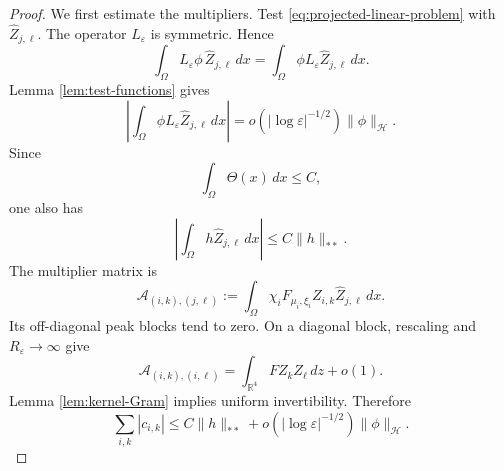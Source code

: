 \documentclass[11pt]{article}
\numberwithin{equation}{section}
\begin{document}
\begin{proof}
We first estimate the multipliers. Test
\eqref{eq:projected-linear-problem} with
$\widehat Z_{j,\ell}$. The operator $L_\varepsilon$ is symmetric.
Hence
\begin{equation*}
\int_\Omega L_\varepsilon\phi\,\widehat Z_{j,\ell}\,dx
=
\int_\Omega\phi L_\varepsilon\widehat Z_{j,\ell}\,dx.
\end{equation*}
Lemma \ref{lem:test-functions} gives
\begin{equation*}
\left|
\int_\Omega\phi L_\varepsilon\widehat Z_{j,\ell}\,dx
\right|
=o(|\log\varepsilon|^{-1/2})\|\phi\|_{\mathcal H}.
\end{equation*}
Since
\begin{equation}\label{eq:theta-L1}
\int_\Omega\Theta(x)\,dx\leq C,
\end{equation}
one also has
\begin{equation*}
\left|\int_\Omega h\widehat Z_{j,\ell}\,dx\right|
\leq C\|h\|_{**}.
\end{equation*}
The multiplier matrix is
\begin{equation}\label{eq:linear-multiplier-matrix}
\mathcal A_{(i,k),(j,\ell)}
:=
\int_\Omega
\chi_iF_{\mu_i,\xi_i}Z_{i,k}\widehat Z_{j,\ell}\,dx.
\end{equation}
Its off-diagonal peak blocks tend to zero. On a diagonal block,
rescaling and $R_\varepsilon\to\infty$ give
\begin{equation*}
\mathcal A_{(i,k),(i,\ell)}
=
\int_{\mathbb R^4}FZ_kZ_\ell\,dz+o(1).
\end{equation*}
Lemma \ref{lem:kernel-Gram} implies uniform invertibility. Therefore
\begin{equation}\label{eq:coefficient-preestimate}
\sum_{i,k}|c_{i,k}|
\leq C\|h\|_{**}
+o(|\log\varepsilon|^{-1/2})\|\phi\|_{\mathcal H}.
\end{equation}


\end{proof}
\end{document}
